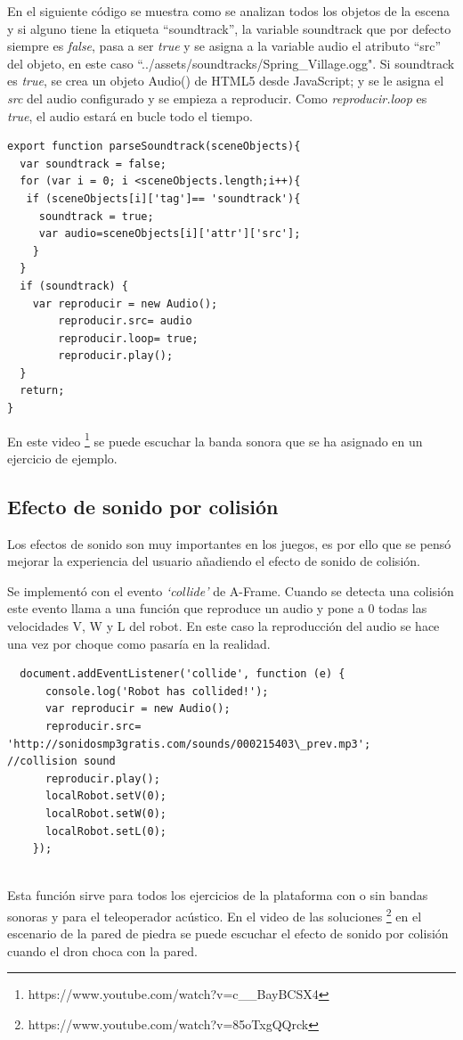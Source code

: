En el siguiente código se muestra como se analizan todos los objetos de la escena y si alguno tiene la etiqueta ``soundtrack'', la variable soundtrack  que por defecto siempre es \textit{false}, pasa a ser \textit{true} y se asigna a la variable audio el atributo  ``src'' del objeto, en este caso ``../assets/soundtracks/Spring\_Village.ogg".  
Si soundtrack es \textit{true}, se crea un objeto Audio() de HTML5 desde JavaScript; y se le asigna el \textit{src} del audio configurado y se empieza a reproducir. Como \textit{reproducir.loop} es \textit{true}, el audio estará en bucle todo el tiempo.

\begin{lstlisting}
export function parseSoundtrack(sceneObjects){
  var soundtrack = false;
  for (var i = 0; i <sceneObjects.length;i++){
   if (sceneObjects[i]['tag']== 'soundtrack'){
     soundtrack = true;
     var audio=sceneObjects[i]['attr']['src'];
    }
  }
  if (soundtrack) {
    var reproducir = new Audio();
        reproducir.src= audio
        reproducir.loop= true;
        reproducir.play();
  }
  return;
}
\end{lstlisting}

En este video \footnote{https://www.youtube.com/watch?v=c\_\_BayBCSX4} se puede escuchar la banda sonora que se ha asignado en un ejercicio de ejemplo.

\subsection{Efecto de sonido por colisión }

Los efectos de sonido son muy importantes en los juegos, es por ello que se pensó mejorar la experiencia del usuario añadiendo el efecto de sonido de colisión. 

Se implementó con el evento \textit{`collide'} de A-Frame. Cuando se detecta una colisión este evento llama a una función que reproduce un audio y pone a 0 todas las velocidades V, W y L del robot.  En este caso la reproducción del audio se hace una vez por choque como pasaría en la realidad.

\begin{lstlisting}
  document.addEventListener('collide', function (e) {
      console.log('Robot has collided!');
      var reproducir = new Audio();
      reproducir.src= 'http://sonidosmp3gratis.com/sounds/000215403\_prev.mp3';   //collision sound
      reproducir.play();
      localRobot.setV(0);
      localRobot.setW(0);
      localRobot.setL(0);
	});
	
\end{lstlisting}

Esta función sirve para todos los ejercicios de la plataforma con o sin  bandas sonoras y para el teleoperador acústico. En el video de las soluciones  \footnote{https://www.youtube.com/watch?v=85oTxgQQrck}  en el escenario de la pared de piedra se puede escuchar el efecto de sonido por colisión cuando el dron choca con la pared.